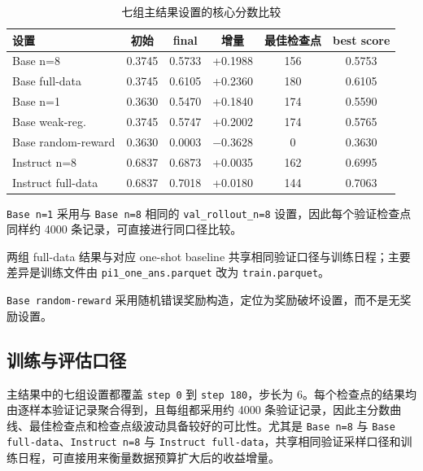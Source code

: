 \documentclass[12pt,a4paper]{ctexart}
\begin{document}
\begin{table}[H]
    \centering
    \caption{七组主结果设置的核心分数比较}
    \label{tab:main-results}
    \begin{threeparttable}
    \begin{tabular}{lccccc}
        \toprule
        设置 & 初始 & final & 增量 & 最佳检查点 & best score \\
        \midrule
        Base n=8 & 0.3745 & 0.5733 & +0.1988 & 156 & 0.5753 \\
        Base full-data\tnote{b} & 0.3745 & 0.6105 & +0.2360 & 180 & 0.6105 \\
        Base n=1\tnote{a} & 0.3630 & 0.5470 & +0.1840 & 174 & 0.5590 \\
        Base weak-reg. & 0.3745 & 0.5747 & +0.2002 & 174 & 0.5765 \\
        Base random-reward\tnote{c} & 0.3630 & 0.0003 & $-$0.3628 & 0 & 0.3630 \\
        Instruct n=8 & 0.6837 & 0.6873 & +0.0035 & 162 & 0.6995 \\
        Instruct full-data\tnote{b} & 0.6837 & 0.7018 & +0.0180 & 144 & 0.7063 \\
        \bottomrule
    \end{tabular}
    \begin{tablenotes}[flushleft]
        \footnotesize
        \item[a] \texttt{Base n=1} 采用与 \texttt{Base n=8} 相同的 \texttt{val\_rollout\_n=8} 设置，因此每个验证检查点同样约 4000 条记录，可直接进行同口径比较。
        \item[b] 两组 full-data 结果与对应 one-shot baseline 共享相同验证口径与训练日程；主要差异是训练文件由 \texttt{pi1\_one\_ans.parquet} 改为 \texttt{train.parquet}。
        \item[c] \texttt{Base random-reward} 采用随机错误奖励构造，定位为奖励破坏设置，而不是无奖励设置。
    \end{tablenotes}
    \end{threeparttable}
\end{table}

\subsection{训练与评估口径}

主结果中的七组设置都覆盖 \texttt{step 0} 到 \texttt{step 180}，步长为 6。每个检查点的结果均由逐样本验证记录聚合得到，且每组都采用约 4000 条验证记录，因此主分数曲线、最佳检查点和检查点级波动具备较好的可比性。尤其是 \texttt{Base n=8} 与 \texttt{Base full-data}、\texttt{Instruct n=8} 与 \texttt{Instruct full-data}，共享相同验证采样口径和训练日程，可直接用来衡量数据预算扩大后的收益增量。
\end{document}
